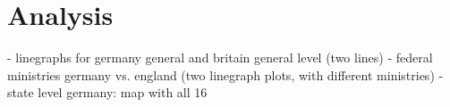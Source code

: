 \section{Analysis}

    

- linegraphs for germany general and britain general level (two lines)
- federal ministries germany vs. england (two linegraph plots, with different ministries)
- state level germany: map with all 16 